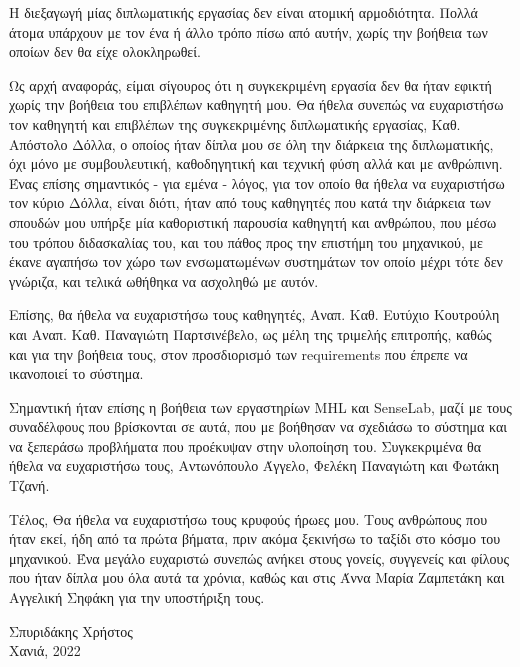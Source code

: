 \begin{acknowledgements}
	\renewcommand\acknowledgementname{Ευχαριστίες}
	\addchaptertocentry{\acknowledgementname} %
	
	Η διεξαγωγή μίας διπλωματικής εργασίας δεν είναι ατομική αρμοδιότητα. Πολλά άτομα υπάρχουν με τον ένα ή άλλο τρόπο πίσω από αυτήν, χωρίς την βοήθεια των οποίων δεν θα είχε ολοκληρωθεί.

	Ως αρχή αναφοράς, είμαι σίγουρος ότι η συγκεκριμένη εργασία δεν θα ήταν εφικτή χωρίς την βοήθεια του επιβλέπων καθηγητή μου. Θα ήθελα συνεπώς να ευχαριστήσω τον καθηγητή και επιβλέπων της συγκεκριμένης διπλωματικής εργασίας, Καθ. Α\-πό\-στο\-λο Δόλλα, ο οποίος ήταν δίπλα μου σε όλη την διάρκεια της διπλωματικής, όχι μόνο με συμβουλευτική, καθοδηγητική και τεχνική φύση αλλά και με ανθρώπινη. Ένας επίσης σημαντικός - για εμένα - λόγος, για τον οποίο θα ήθελα να ευχαριστήσω τον κύριο Δόλλα, είναι διότι, ήταν από τους καθηγητές που κατά την διάρκεια των σπουδών μου υπήρξε μία καθοριστική παρουσία καθηγητή και ανθρώπου, που μέσω του τρόπου διδασκαλίας του, και του πάθος προς την επιστήμη του μηχανικού, με έκανε αγαπήσω τον χώρο των ενσωματωμένων συστημάτων τον οποίο μέχρι τότε δεν γνώριζα, και τελικά ωθήθηκα να ασχοληθώ με αυτόν.

	Επίσης, θα ήθελα να ευχαριστήσω τους καθηγητές, Αναπ. Καθ. Ευτύχιο Κουτρούλη και Αναπ. Καθ. Παναγιώτη Παρτσινέβελο, ως μέλη της τριμελής επιτροπής, καθώς και για την βοήθεια τους, στον προσδιορισμό των requirements που έπρεπε να ικανοποιεί το σύστημα.  

	Σημαντική ήταν επίσης η βοήθεια των εργαστηρίων MHL και SenseLab, μαζί με τους συναδέλφους που βρίσκονται σε αυτά, που με βοήθησαν να σχεδιάσω το σύστημα και να ξεπεράσω προβλήματα που προέκυψαν στην υλοποίηση του. Συγκεκριμένα θα ήθελα να ευχαριστήσω τους, Αντωνόπουλο Άγγελο, Φελέκη Παναγιώτη και Φωτάκη Τζανή. 

	Τέλος, Θα ήθελα να ευχαριστήσω τους κρυφούς ήρωες μου. Τους ανθρώπους που ήταν εκεί, ήδη από τα πρώτα βήματα, πριν ακόμα ξεκινήσω το ταξίδι στο κόσμο του μηχανικού. Ένα μεγάλο ευχαριστώ συνεπώς ανήκει στους γονείς, συγγενείς και φίλους που ήταν δίπλα μου όλα αυτά τα χρόνια, καθώς και στις Άννα Μαρία Ζα\-μπε\-τά\-κη και Αγγελική Σηφάκη για την υποστήριξη τους. 

	\begin{flushright}Σπυριδάκης Χρήστος\\ Χανιά, 2022\end{flushright}
\end{acknowledgements}
